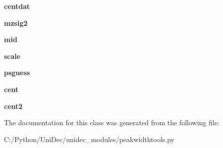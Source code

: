 \begin{DoxyCompactItemize}
\item 
\hypertarget{class_uni_dec_1_1unidec__modules_1_1peakwidthtools_1_1_peak_tools2d_afec7ce930fced155fe933585e6e8179e}{}{\bfseries centdat}\label{class_uni_dec_1_1unidec__modules_1_1peakwidthtools_1_1_peak_tools2d_afec7ce930fced155fe933585e6e8179e}

\item 
\hypertarget{class_uni_dec_1_1unidec__modules_1_1peakwidthtools_1_1_peak_tools2d_a3396132fe32b0b9782893b9e05eac5d5}{}{\bfseries mzsig2}\label{class_uni_dec_1_1unidec__modules_1_1peakwidthtools_1_1_peak_tools2d_a3396132fe32b0b9782893b9e05eac5d5}

\item 
\hypertarget{class_uni_dec_1_1unidec__modules_1_1peakwidthtools_1_1_peak_tools2d_a6a5411b67a1320658f4f338c44a826b8}{}{\bfseries mid}\label{class_uni_dec_1_1unidec__modules_1_1peakwidthtools_1_1_peak_tools2d_a6a5411b67a1320658f4f338c44a826b8}

\item 
\hypertarget{class_uni_dec_1_1unidec__modules_1_1peakwidthtools_1_1_peak_tools2d_a46121bbb55ba1bea84b9572ac4da7ef2}{}{\bfseries scale}\label{class_uni_dec_1_1unidec__modules_1_1peakwidthtools_1_1_peak_tools2d_a46121bbb55ba1bea84b9572ac4da7ef2}

\item 
\hypertarget{class_uni_dec_1_1unidec__modules_1_1peakwidthtools_1_1_peak_tools2d_a07cfd6e0335cce4df994f9f7b3c6099c}{}{\bfseries psguess}\label{class_uni_dec_1_1unidec__modules_1_1peakwidthtools_1_1_peak_tools2d_a07cfd6e0335cce4df994f9f7b3c6099c}

\item 
\hypertarget{class_uni_dec_1_1unidec__modules_1_1peakwidthtools_1_1_peak_tools2d_a5c2fe6d491cb0d743ee4aa04c4664e00}{}{\bfseries cent}\label{class_uni_dec_1_1unidec__modules_1_1peakwidthtools_1_1_peak_tools2d_a5c2fe6d491cb0d743ee4aa04c4664e00}

\item 
\hypertarget{class_uni_dec_1_1unidec__modules_1_1peakwidthtools_1_1_peak_tools2d_a9c4075cb1a4cc126cc3a063eb92a6cd9}{}{\bfseries cent2}\label{class_uni_dec_1_1unidec__modules_1_1peakwidthtools_1_1_peak_tools2d_a9c4075cb1a4cc126cc3a063eb92a6cd9}

\end{DoxyCompactItemize}


The documentation for this class was generated from the following file\+:\begin{DoxyCompactItemize}
\item 
C\+:/\+Python/\+Uni\+Dec/unidec\+\_\+modules/peakwidthtools.\+py\end{DoxyCompactItemize}
